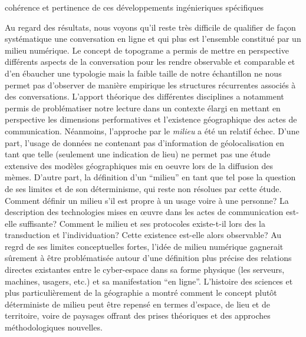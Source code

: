 cohérence et pertinence de ces développements ingénieriques  spécifiques

Au regard des r\'esultats, nous voyons qu{\textquoteright}il reste tr\`es difficile de qualifier de fa\c{c}on syst\'ematique une conversation en ligne et qui plus est l{\textquoteright}ensemble constitu\'e par un milieu num\'erique. Le concept de topograme a permis de mettre en perspective diff\'erents aspects de la conversation pour les rendre observable et comparable et d{\textquoteright}en \'ebaucher une typologie mais la faible taille de notre \'echantillon ne nous permet pas d{\textquoteright}observer de mani\`ere empirique les structures r\'ecurrentes associ\'es \`a des conversations. L{\textquoteright}apport th\'eorique des diff\'erentes disciplines a notamment permis de probl\'ematiser notre lecture dans un contexte \'elargi en mettant en perspective les dimensions performatives et l{\textquoteright}existence g\'eographique des actes de communication. N\'eanmoins, l{\textquoteright}approche par le \textit{milieu} a \'et\'e un relatif \'echec. D{\textquoteright}une part, l{\textquoteright}usage de donn\'ees ne contenant pas d{\textquoteright}information de g\'eolocalisation en tant que telle (seulement une indication de lieu) ne permet pas une \'etude extensive des mod\`eles g\'eographiques mis en oeuvre lors de la diffusion des m\`emes. D{\textquoteright}autre part, la d\'efinition d{\textquoteright}un {\textquotedblleft}milieu{\textquotedblright} en tant que tel pose la question de ses limites et de son d\'eterminisme, qui reste non r\'esolues par cette \'etude. Comment d\'efinir un milieu s{\textquoteright}il est propre \`a un usage voire \`a une personne? La description des technologies mises en {\oe}uvre dans les actes de communication est-elle suffisante? Comment le milieu et ses protocoles existe-t-il lors des la transduction et l{\textquoteright}individuation? Cette existence est-elle alors observable? Au regrd de ses limites conceptuelles fortes, l{\textquoteright}id\'ee de milieu num\'erique gagnerait s\^urement \`a \^etre probl\'ematis\'ee autour d{\textquoteright}une d\'efinition plus pr\'ecise des relations directes existantes entre le cyber-espace dans sa forme physique (les serveurs, machines, usagers, etc.) et sa manifestation {\textquotedblleft}en ligne{\textquotedblright}. L{\textquoteright}histoire des sciences et plus particuli\`erement de la g\'eographie a montr\'e comment le concept plut\^ot d\'eterministe de milieu peut \^etre repens\'e en termes d{\textquoteright}espace, de lieu et de territoire, voire de paysages offrant des prises th\'eoriques et des approches m\'ethodologiques nouvelles.

